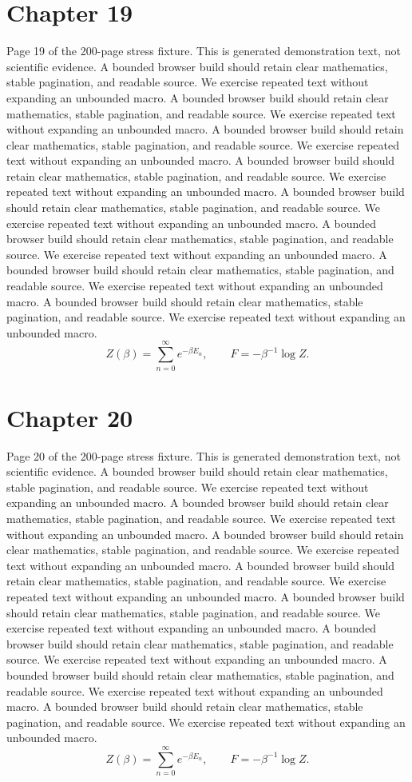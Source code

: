 \documentclass[11pt]{article}
\begin{document}
\section*{Chapter 19}
Page 19 of the 200-page stress fixture. This is generated demonstration text, not scientific evidence.
A bounded browser build should retain clear mathematics, stable pagination, and readable source. We exercise repeated text without expanding an unbounded macro.
A bounded browser build should retain clear mathematics, stable pagination, and readable source. We exercise repeated text without expanding an unbounded macro.
A bounded browser build should retain clear mathematics, stable pagination, and readable source. We exercise repeated text without expanding an unbounded macro.
A bounded browser build should retain clear mathematics, stable pagination, and readable source. We exercise repeated text without expanding an unbounded macro.
A bounded browser build should retain clear mathematics, stable pagination, and readable source. We exercise repeated text without expanding an unbounded macro.
A bounded browser build should retain clear mathematics, stable pagination, and readable source. We exercise repeated text without expanding an unbounded macro.
A bounded browser build should retain clear mathematics, stable pagination, and readable source. We exercise repeated text without expanding an unbounded macro.
A bounded browser build should retain clear mathematics, stable pagination, and readable source. We exercise repeated text without expanding an unbounded macro.
\[Z(\beta)=\sum_{n=0}^{\infty}e^{-\beta E_n},\qquad F=-\beta^{-1}\log Z.\]
\newpage
\section*{Chapter 20}
Page 20 of the 200-page stress fixture. This is generated demonstration text, not scientific evidence.
A bounded browser build should retain clear mathematics, stable pagination, and readable source. We exercise repeated text without expanding an unbounded macro.
A bounded browser build should retain clear mathematics, stable pagination, and readable source. We exercise repeated text without expanding an unbounded macro.
A bounded browser build should retain clear mathematics, stable pagination, and readable source. We exercise repeated text without expanding an unbounded macro.
A bounded browser build should retain clear mathematics, stable pagination, and readable source. We exercise repeated text without expanding an unbounded macro.
A bounded browser build should retain clear mathematics, stable pagination, and readable source. We exercise repeated text without expanding an unbounded macro.
A bounded browser build should retain clear mathematics, stable pagination, and readable source. We exercise repeated text without expanding an unbounded macro.
A bounded browser build should retain clear mathematics, stable pagination, and readable source. We exercise repeated text without expanding an unbounded macro.
A bounded browser build should retain clear mathematics, stable pagination, and readable source. We exercise repeated text without expanding an unbounded macro.
\[Z(\beta)=\sum_{n=0}^{\infty}e^{-\beta E_n},\qquad F=-\beta^{-1}\log Z.\]
\newpage
\end{document}
